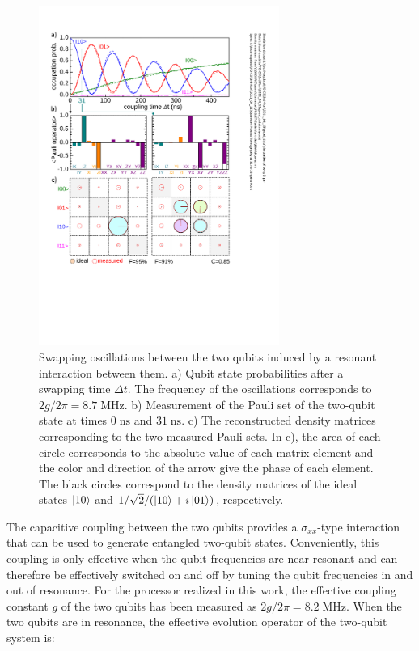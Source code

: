 \begin{figure}
	\centering
		\includegraphics[width=0.7\textwidth]{./material/papers/iswap/submission1/Dewes_Figure2}
	\caption[Generating entangled two-qubit states by swapping interaction]{Swapping oscillations between the two qubits induced by a resonant interaction between them. a) Qubit state probabilities after     a swapping  time $\Delta t$. The frequency of the oscillations corresponds to $2g /2\pi = 8.7 \; \mathrm{MHz}$. b) Measurement of the Pauli set of the two-qubit state   at times $0\;   \mathrm{ns}$ and $31\; \mathrm{ns}$.  c) The reconstructed density matrices corresponding to the two measured Pauli sets. In c), the area of each circle corresponds to the absolute value of each matrix element and the color and direction of the arrow give the phase of each element. The black circles correspond to the density matrices of the ideal states $\left| 10 \right>$ and $1/\sqrt{2}/(\left| 10 \right>+i\left| 01 \right>)$, respectively.}
	\label{fig:swap_interaction_state_tomography}
\end{figure}

The capacitive coupling between the two qubits provides a $\sigma_{xx}$-type interaction that can be used to generate entangled two-qubit states. Conveniently, this coupling is only effective when the qubit frequencies are near-resonant and can therefore be effectively switched on and off by tuning the qubit frequencies in and out of resonance. For the processor realized in this work, the effective coupling constant $g$ of the two qubits has been measured as $2g/2\pi = 8.2 \; \mathrm{MHz}$. When the two qubits are in resonance, the effective evolution operator of the two-qubit system is:

